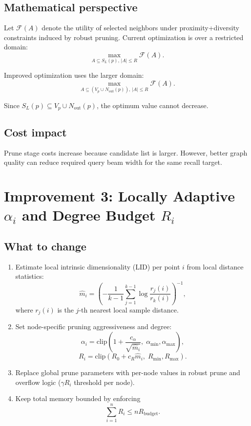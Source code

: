\documentclass[11pt]{article}
\begin{document}
\subsection{Mathematical perspective}
Let $\mathcal{F}(A)$ denote the utility of selected neighbors under proximity+diversity constraints induced by robust pruning. Current optimization is over a restricted domain:
\begin{equation}
\max_{A\subseteq S_L(p),\,|A|\le R} \mathcal{F}(A).
\end{equation}

Improved optimization uses the larger domain:
\begin{equation}
\max_{A\subseteq (V_p\cup N_{\text{out}}(p)),\,|A|\le R} \mathcal{F}(A).
\end{equation}

Since $S_L(p)\subseteq V_p\cup N_{\text{out}}(p)$, the optimum value cannot decrease.

\subsection{Cost impact}
Prune stage costs increase because candidate list is larger. However, better graph quality can reduce required query beam width for the same recall target.

\section{Improvement 3: Locally Adaptive $\alpha_i$ and Degree Budget $R_i$}

\subsection{What to change}
\begin{enumerate}[leftmargin=*]
    \item Estimate local intrinsic dimensionality (LID) per point $i$ from local distance statistics:
    \begin{equation}
    \widehat{m}_i = \left(-\frac{1}{k-1}\sum_{j=1}^{k-1}\log\frac{r_j(i)}{r_k(i)}\right)^{-1},
    \end{equation}
    where $r_j(i)$ is the $j$-th nearest local sample distance.
    \item Set node-specific pruning aggressiveness and degree:
    \begin{equation}
    \alpha_i = \mathrm{clip}\left(1+\frac{c_\alpha}{\sqrt{\widehat{m}_i}},\;\alpha_{\min},\alpha_{\max}\right),
    \end{equation}
    \begin{equation}
    R_i = \mathrm{clip}\left(R_0 + c_R\widehat{m}_i,\;R_{\min},R_{\max}\right).
    \end{equation}
    \item Replace global prune parameters with per-node values in robust prune and overflow logic ($\gamma R_i$ threshold per node).
    \item Keep total memory bounded by enforcing
    \begin{equation}
    \sum_{i=1}^n R_i \le nR_{\text{budget}}.
    \end{equation}
\end{enumerate}
\end{document}
